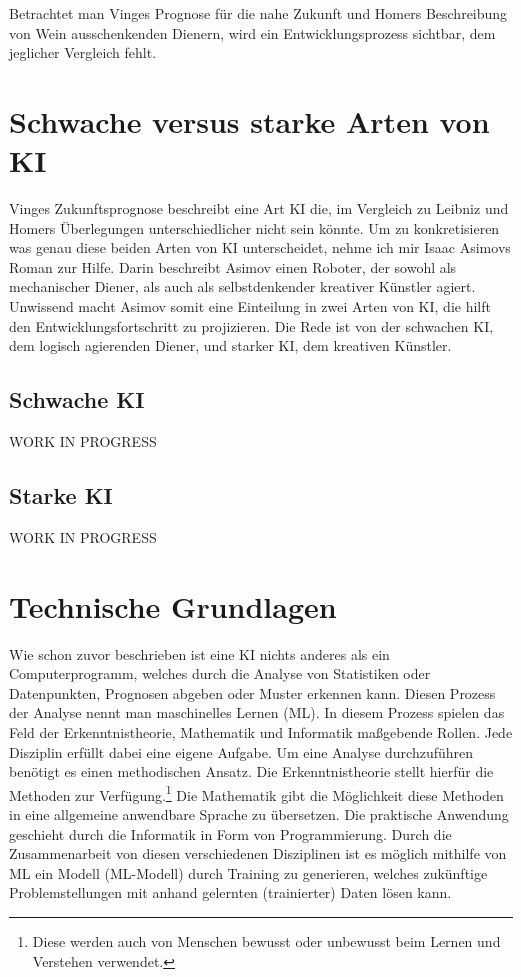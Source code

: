 \documentclass[12pt,german,ngerman]{report}
\begin{document}
        Betrachtet man Vinges Prognose für die nahe Zukunft
        und Homers Beschreibung von Wein ausschenkenden Dienern,
        wird ein Entwicklungsprozess sichtbar, dem jeglicher Vergleich fehlt. 



\chapter{Schwache versus starke Arten von KI}
    Vinges Zukunftsprognose\cite[1]{vinge1993technological} beschreibt eine Art KI die,
    im Vergleich zu Leibniz und Homers Überlegungen unterschiedlicher nicht sein könnte.
    Um zu konkretisieren was genau diese beiden Arten von KI unterscheidet, nehme ich
    mir Isaac Asimovs Roman  zur Hilfe.
    Darin beschreibt Asimov einen Roboter, der sowohl als mechanischer Diener, als
    auch als selbstdenkender kreativer Künstler agiert.\cite{asimov2000der}
    Unwissend macht Asimov somit eine Einteilung in zwei Arten von KI,
    die hilft den Entwicklungsfortschritt zu projizieren.
    Die Rede ist von der schwachen KI, dem logisch agierenden Diener, und
    starker KI, dem kreativen Künstler.

    \section{Schwache KI}
        {\selectfont
            WORK IN PROGRESS
        }
    \section{Starke KI}
        {\selectfont
            WORK IN PROGRESS
        }

\chapter{Technische Grundlagen}
     Wie schon zuvor beschrieben ist eine KI nichts anderes als ein Computerprogramm,
     welches durch die Analyse von Statistiken oder Datenpunkten, Prognosen abgeben oder Muster erkennen kann.
     Diesen Prozess der Analyse nennt man maschinelles Lernen (ML).
     In diesem Prozess spielen das Feld der Erkenntnistheorie, Mathematik und Informatik 
     maßgebende Rollen. Jede Disziplin erfüllt dabei eine eigene Aufgabe.
     Um eine Analyse durchzuführen benötigt es einen methodischen Ansatz.
     Die Erkenntnistheorie stellt hierfür die Methoden zur Verfügung.\footnote{Diese werden auch von 
     Menschen bewusst oder unbewusst beim Lernen und Verstehen verwendet.}
     Die Mathematik gibt die Möglichkeit diese Methoden in eine allgemeine anwendbare Sprache zu übersetzen.
     Die praktische Anwendung geschieht durch die Informatik in Form von Programmierung.
     Durch die Zusammenarbeit von diesen verschiedenen Disziplinen ist es
     möglich mithilfe von ML ein Modell (ML-Modell) durch Training zu generieren,
     welches zukünftige Problemstellungen mit anhand gelernten (trainierter) Daten lösen kann.
        
\end{document}
